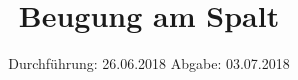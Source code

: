 

\subject{406}
\title{Beugung am Spalt}
\date{%
  Durchführung: 26.06.2018
  \hspace{3em}
  Abgabe: 03.07.2018
}



\maketitle
\thispagestyle{empty}
\tableofcontents
\newpage






\printbibliography{}


